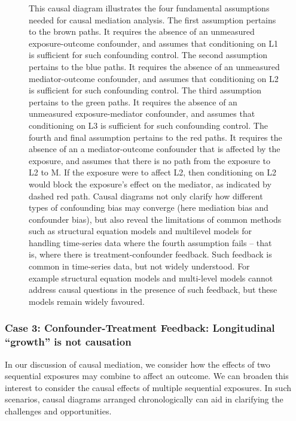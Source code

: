 \documentclass[
  singlecolumn,
  9pt]{article}
\begin{document}
\begin{figure}


\caption{\label{fig-dag-mediation-assumptions}This causal diagram
illustrates the four fundamental assumptions needed for causal mediation
analysis. The first assumption pertains to the brown paths. It requires
the absence of an unmeasured exposure-outcome confounder, and assumes
that conditioning on L1 is sufficient for such confounding control. The
second assumption pertains to the blue paths. It requires the absence of
an unmeasured mediator-outcome confounder, and assumes that conditioning
on L2 is sufficient for such confounding control. The third assumption
pertains to the green paths. It requires the absence of an unmeasured
exposure-mediator confounder, and assumes that conditioning on L3 is
sufficient for such confounding control. The fourth and final assumption
pertains to the red paths. It requires the absence of an a
mediator-outcome confounder that is affected by the exposure, and
assumes that there is no path from the exposure to L2 to M. If the
exposure were to affect L2, then conditioning on L2 would block the
exposure's effect on the mediator, as indicated by dashed red path.
Causal diagrams not only clarify how different types of confounding bias
may converge (here mediation bias and confounder bias), but also reveal
the limitations of common methods such as structural equation models and
multilevel models for handling time-series data where the fourth
assumption fails -- that is, where there is treatment-confounder
feedback. Such feedback is common in time-series data, but not widely
understood. For example structural equation models and multi-level
models cannot address causal questions in the presence of such feedback,
but these models remain widely favoured.}

\end{figure}%

\subsubsection{Case 3: Confounder-Treatment Feedback: Longitudinal
``growth'' is not
causation}\label{case-3-confounder-treatment-feedback-longitudinal-growth-is-not-causation}

In our discussion of causal mediation, we consider how the effects of
two sequential exposures may combine to affect an outcome. We can
broaden this interest to consider the causal effects of multiple
sequential exposures. In such scenarios, causal diagrams arranged
chronologically can aid in clarifying the challenges and opportunities.
\end{document}
